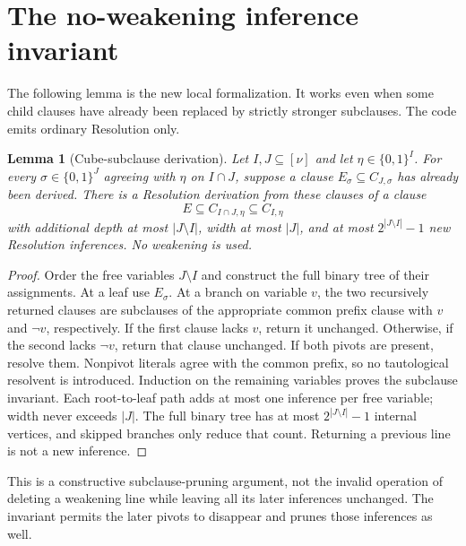 \documentclass[11pt]{article}
\newtheorem{lemma}[theorem]{Lemma}
\begin{document}
\section{The no-weakening inference invariant}
The following lemma is the new local formalization. It works even when
some child clauses have already been replaced by strictly stronger
subclauses. The code emits ordinary Resolution only.

\begin{lemma}[Cube-subclause derivation]\label{lem:subclause}
Let $I,J\subseteq[\nu]$ and let $\eta\in\{0,1\}^I$. For every
$\sigma\in\{0,1\}^J$ agreeing with $\eta$ on $I\cap J$, suppose a clause
$E_\sigma\subseteq C_{J,\sigma}$ has already been derived. There is a
Resolution derivation from these clauses of a clause
\[
                E\subseteq C_{I\cap J,\eta}\subseteq C_{I,\eta}
\]
with additional depth at most $|J\setminus I|$, width at most $|J|$, and
at most $2^{|J\setminus I|}-1$ new Resolution inferences. No weakening is used.
\end{lemma}
\begin{proof}
Order the free variables $J\setminus I$ and construct the full binary tree
of their assignments. At a leaf use $E_\sigma$. At a branch on variable
$v$, the two recursively returned clauses are subclauses of the appropriate
common prefix clause with $v$ and $\neg v$, respectively. If the first
clause lacks $v$, return it unchanged. Otherwise, if the second lacks
$\neg v$, return that clause unchanged. If both pivots are present, resolve
them. Nonpivot literals agree with the common prefix, so no tautological
resolvent is introduced. Induction on the remaining variables proves the
subclause invariant. Each root-to-leaf path adds at most one inference per
free variable; width never exceeds $|J|$. The full binary tree has at most
$2^{|J\setminus I|}-1$ internal vertices, and skipped branches only reduce
that count. Returning a previous line is not a new inference.
\end{proof}

This is a constructive subclause-pruning argument, not the invalid operation
of deleting a weakening line while leaving all its later inferences
unchanged. The invariant permits the later pivots to disappear and prunes
those inferences as well.
\end{document}

